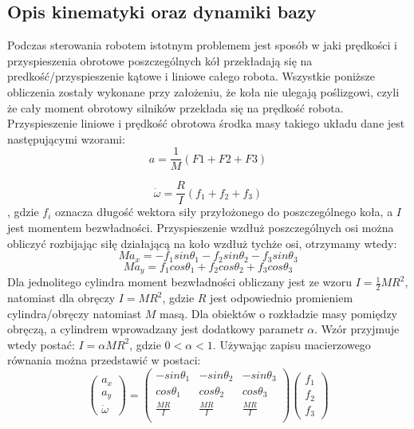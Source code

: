 \subsection{Opis kinematyki oraz dynamiki bazy}
Podczas sterowania robotem istotnym problemem jest sposób w jaki prędkości i przyspieszenia obrotowe poszczególnych kół przekładają się
na predkość/przyspieszenie kątowe i liniowe całego robota. Wszystkie poniższe obliczenia zostały wykonane przy założeniu, że koła nie ulegają poślizgowi,
czyli że cały moment obrotowy silników przekłada się na prędkość robota.
Przyspieszenie liniowe i prędkość obrotowa środka masy takiego układu dane jest następującymi wzorami:
\begin{equation}
a=\frac{1}{M}(F1+F2+F3)
\end{equation}

\begin{equation}
\dot{ \omega }=\frac{R}{I}(f_1+f_2+f_3)
\end{equation}
, gdzie $f_i$ oznacza długość wektora siły przyłożonego do poszczególnego koła, a $I$  jest momentem bezwładności.
Przyspieszenie wzdłuż poszczególnych osi można obliczyć rozbijając siłę działającą na koło wzdłuż tychże osi, otrzymamy wtedy:
\begin{equation}
Ma_x=-f_1sin\theta_1 - f_2sin\theta_2 - f_3sin\theta_3
\end{equation}
\begin{equation}
Ma_y=f_1cos\theta_1 + f_2cos\theta_2 + f_3cos\theta_3
\end{equation}
Dla jednolitego cylindra moment bezwładności obliczany jest ze wzoru $I=\frac{1}{2}MR^2$, natomiast dla obręczy $I=MR^2$, gdzie $R$ jest odpowiednio promieniem
\mbox{cylindra/obręczy} natomiast $M$ masą. Dla obiektów o rozkładzie masy pomiędzy
obręczą, a cylindrem wprowadzany jest dodatkowy parametr $\alpha$. Wzór przyjmuje wtedy postać: $I=\alpha MR^2$, gdzie $0<\alpha<1$.
Używając zapisu macierzowego równania można przedstawić w postaci:
\begin{equation}
 \begin{pmatrix}
  a_x\\
  a_y\\
  \dot{\omega}
 \end{pmatrix}
  =
\begin{pmatrix}
  -sin\theta_1 & -sin\theta_2 & -sin\theta_3 \\
  cos\theta_1 & cos\theta_2 & cos\theta_3 \\
  \frac{MR}{I} & \frac{MR}{I} & \frac{MR}{I}\\
 \end{pmatrix} 
 \begin{pmatrix}
  f_1\\
  f_2\\
  f_3
 \end{pmatrix}
\end{equation}

